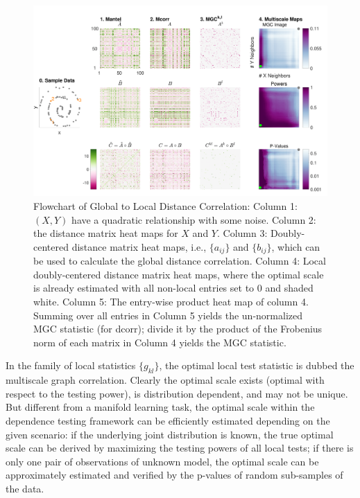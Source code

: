 \documentclass[11pt]{article}
\begin{document}
\begin{figure}[htbp]
\includegraphics[width=1.0\textwidth]{../Figures/FigA}
\caption{
Flowchart of Global to Local Distance Correlation: Column 1: $(X,Y)$ have a quadratic relationship with some noise. Column 2: the distance matrix heat maps for $X$ and $Y$. Column 3: Doubly-centered distance matrix heat maps, i.e., $\{a_{ij}\}$ and $\{b_{ij}\}$, which can be used to calculate the global distance correlation. Column 4: Local doubly-centered distance matrix heat maps, where the optimal scale is already estimated with all non-local entries set to $0$ and shaded white. Column 5: The entry-wise product heat map of column 4. Summing over all entries in Column 5 yields the un-normalized MGC statistic (for dcorr); divide it by the product of the Frobenius norm of each matrix in Column 4 yields the MGC statistic. }
\label{fig:A}
\end{figure}

In the family of local statistics $\{g_{kl}\}$, the optimal local test statistic is dubbed the multiscale graph correlation. Clearly the optimal scale exists (optimal with respect to the testing power), is distribution dependent, and may not be unique. But different from a manifold learning task, the optimal scale within the dependence testing framework can be efficiently estimated depending on the given scenario: if the underlying joint distribution is known, the true optimal scale can be derived by maximizing the testing powers of all local tests; if there is only one pair of observations of unknown model, the optimal scale can be approximately estimated and verified by the p-values of random sub-samples of the data. %
\end{document}
